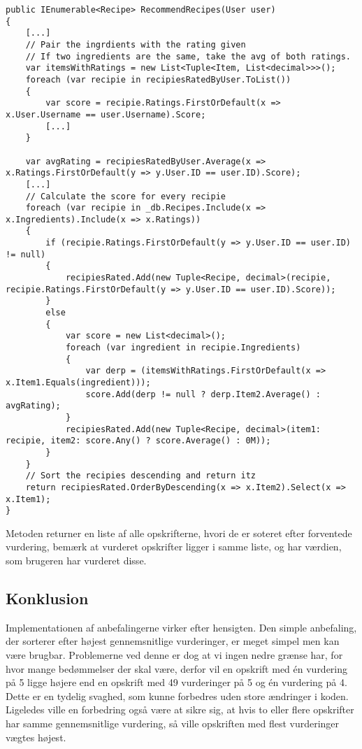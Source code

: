 \begin{lstlisting}[caption=Metoden RecommendRecipes. Sorterer opskrifter efter forventede vurdering for en given bruger.", label=recommendrecipes]
public IEnumerable<Recipe> RecommendRecipes(User user)
{
    [...]
    // Pair the ingrdients with the rating given
    // If two ingredients are the same, take the avg of both ratings.
    var itemsWithRatings = new List<Tuple<Item, List<decimal>>>();
    foreach (var recipie in recipiesRatedByUser.ToList())
    {
        var score = recipie.Ratings.FirstOrDefault(x => x.User.Username == user.Username).Score;
        [...]
    }

    var avgRating = recipiesRatedByUser.Average(x => x.Ratings.FirstOrDefault(y => y.User.ID == user.ID).Score);
    [...]
    // Calculate the score for every recipie
    foreach (var recipie in _db.Recipes.Include(x => x.Ingredients).Include(x => x.Ratings))
    {
        if (recipie.Ratings.FirstOrDefault(y => y.User.ID == user.ID) != null)
        {
            recipiesRated.Add(new Tuple<Recipe, decimal>(recipie, recipie.Ratings.FirstOrDefault(y => y.User.ID == user.ID).Score));
        }
        else
        {
            var score = new List<decimal>();
            foreach (var ingredient in recipie.Ingredients)
            {
                var derp = (itemsWithRatings.FirstOrDefault(x => x.Item1.Equals(ingredient)));
                score.Add(derp != null ? derp.Item2.Average() : avgRating);
            }
            recipiesRated.Add(new Tuple<Recipe, decimal>(item1: recipie, item2: score.Any() ? score.Average() : 0M));
        }
    }
    // Sort the recipies descending and return itz
    return recipiesRated.OrderByDescending(x => x.Item2).Select(x => x.Item1);
}
\end{lstlisting}

Metoden returner en liste af alle opskrifterne, hvori de er soteret efter forventede vurdering, bemærk at vurderet opskrifter ligger i samme liste, og har værdien, som brugeren har vurderet disse.

\subsection{Konklusion}
Implementationen af anbefalingerne virker efter hensigten.
Den simple anbefaling, der sorterer efter højest gennemsnitlige vurderinger, er meget simpel men kan være brugbar.
Problemerne ved denne er dog at vi ingen nedre grænse har, for hvor mange bedømmelser der skal være, derfor vil en opskrift med én vurdering på 5 ligge højere end en opskrift med 49 vurderinger på 5 og én vurdering på 4.
Dette er en tydelig svaghed, som kunne forbedres uden store ændringer i koden.
Ligeledes ville en forbedring også være at sikre sig, at hvis to eller flere opskrifter har samme gennemsnitlige vurdering, så ville opskriften med flest vurderinger vægtes højest.

